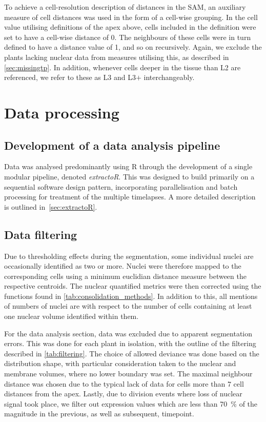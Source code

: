 To achieve a cell-resolution description of distances in the SAM,
an auxiliary measure of cell distances was used in the form of a cell-wise
grouping. In the cell value utilising definitions of the apex above, cells
included in the definition were set to have a cell-wise distance of 0. The
neighbours of these cells were in turn defined to have a distance value of 1,
and so on recursively. Again, we exclude the plants lacking nuclear data from
measures utilising this, as described in \cref{sec:missingtp}. In addition,
whenever cells deeper in the tissue than L2 are  
referenced, we refer to these as L3 and L3$+$ interchangeably.

\section[Data processing]{Data processing}
\label{sec:data_processing}

\subsection[Data analysis tools]{Development of a data analysis pipeline}
\label{sec:pipeline}
Data was analysed predominantly using R through the development of a single
modular pipeline, denoted \textit{extractoR}. This was designed to build 
primarily on a sequential software design pattern,  
incorporating parallelisation and batch processing for treatment of the multiple
timelapses. A more detailed description is outlined in~\cref{sec:extractoR}.

\subsection[Data filtering]{Data filtering}
\label{sec:filtering}
Due to thresholding effects during the segmentation, some
individual nuclei are occasionally identified as two or more. Nuclei were
therefore mapped to the corresponding cells using a minimum euclidian distance
measure between the respective centroids. The nuclear quantified metrics were
then corrected using the functions found in \cref{tab:consolidation_methods}. In
addition to this, all mentions of numbers of nuclei are with respect to the
number of cells containing at least one nuclear volume identified
within them.

For the data analysis section, data was excluded due to apparent segmentation
errors. This was done for each plant in isolation, with the outline of the
filtering described in \cref{tab:filtering}. The choice of allowed
deviance was done based on the distribution shape, 
with particular consideration 
taken to the nuclear and membrane volumes, where no lower boundary was set. The
maximal neighbour distance was chosen due to the typical lack of data for cells more
than $7$ cell distances from the apex. Lastly, due to division events where
loss of nuclear signal took place, we filter out expression values which are
less than 70~\% of the magnitude in the previous, as well as subsequent, timepoint.

